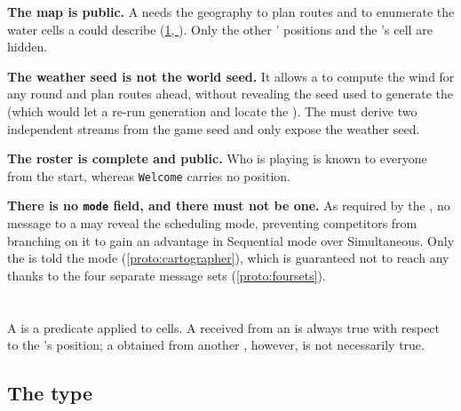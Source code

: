 \documentclass{article}
\newcommand{\fullref}[1]{\hyperref[#1]{\cref*{#1}, \nameref*{#1}}}
\begin{document}
\textbf{The map is public.} A \ship{} needs the geography to plan routes and to enumerate the water
cells a \clue{} could describe (\fullref{proto:clue}). Only the other \ships{}' positions and the
\treasure{}'s cell are hidden.

\textbf{The weather seed is not the world seed.} It allows a \ship{} to compute the wind for any
round and plan routes ahead, without revealing the seed used to generate the \archipelago{} (which
would let a \ship{} re-run generation and locate the \treasure{}). The \chart{} must derive two
independent streams from the game seed and only expose the weather seed.

\textbf{The roster is complete and public.} Who is playing is known to everyone from the start,
whereas \texttt{Welcome} carries no position.

\textbf{There is no \texttt{mode} field, and there must not be one.} As required by the \MD{}, no
message to a \ship{} may reveal the scheduling mode, preventing competitors from branching on it to
gain an advantage in Sequential mode over Simultaneous. Only the \cartographer{} is told the mode
(\cref{proto:cartographer}), which is guaranteed not to reach any \ship{} thanks to the four
separate message sets (\cref{proto:foursets}).

\newpage
\section{\clues{}}
\label{proto:clue}

A \clue{} is a predicate applied to cells.
A \clue{} received from an \island{} is always true with respect to the \treasure{}'s position; a \clue{} obtained from another \ship{}, however, is not necessarily true.

\subsection{The type}
\end{document}
